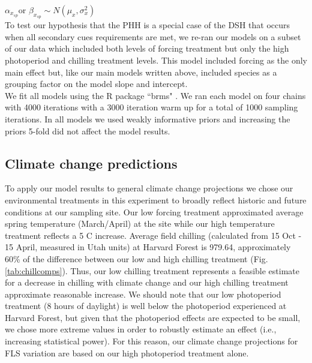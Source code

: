 \documentclass[11pt]{article}
\begin{document}
$\alpha_{x_{sp}} $or $\beta_{x_{sp}} \sim N(\mu_x,\sigma^2_x)$\\

\noindent To test our hypothesis that the PHH is a special case of the DSH that occurs when all secondary cues requirements are met, we re-ran our models on a subset of our data which included both levels of forcing treatment but only the high photoperiod and chilling treatment levels. This model included forcing as the only main effect but, like our main models written above, included species as a grouping factor on the model slope and intercept.\\ 

\noindent We fit all models using the R package ``brms" \citep{Burkner2018}. We ran each model on four chains with 4000 iterations with a 3000 iteration warm up for a total of 1000 sampling iterations. In all models we used weakly informative priors and increasing the priors 5-fold did not affect the model results.\\ %

 

\subsection*{Climate change predictions}
\noindent To apply our model results to general climate change projections we chose our environmental treatments in this experiment to broadly reflect historic and future conditions at our sampling site. Our low forcing treatment approximated average spring temperature (March/April) at the site while our high temperature treatment reflects a 5 \degree C increase. Average field chilling (calculated from 15 Oct - 15 April, measured in Utah units) at Harvard Forest is 979.64, approximately 60\% of the difference between our low and high chilling treatment (Fig. \ref{tab:chillcomps}). Thus, our low chilling treatment represents a feasible estimate for a decrease in chilling with climate change and our high chilling treatment approximate reasonable increase. We should note that our low photoperiod treatment (8 hours of daylight) is well below the photoperiod experienced at Harvard Forest, but given that the photoperiod effects are expected to be small, we chose more extreme values in order to robustly estimate an effect (i.e., increasing statistical power). For this reason, our climate change projections for FLS variation are based on our high photoperiod treatment alone.\\
\end{document}
